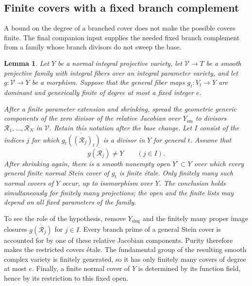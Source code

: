 \documentclass[12pt,a4paper,psamsfonts]{amsart}
\theoremstyle{definition}
\theoremstyle{plain}
\newtheorem{lemma}{Lemma}[section]
\begin{document}
\subsection{Finite covers with a fixed branch complement}

A bound on the degree of a branched cover does not make the
possible covers finite.  The final companion input supplies the
needed fixed branch complement from a family whose branch
divisors do not sweep the base.

\begin{lemma}
\label{j:finite-covers}
Let $Y$ be a normal integral projective variety, let
$\mathcal V\to T$ be a smooth projective family with integral
fibers over an integral parameter variety, and let
$g:\mathcal V\to Y$ be a morphism.  Suppose that the general
fiber maps $g_t:V_t\to Y$ are dominant and generically finite of
degree at most a fixed integer $e$.

After a finite parameter extension and shrinking, spread the
geometric generic components of the zero divisor of the relative
Jacobian over $Y_{\mathrm{sm}}$ to divisors
$\mathcal R_1,\ldots,\mathcal R_N$ in $\mathcal V$.
Retain this notation after the base change.  Let $I$ consist of
the indices $j$ for which
$\overline{g_t((\mathcal R_j)_t)}$ is a divisor in $Y$ for general
$t$.  Assume that
\[
 \overline{g(\mathcal R_j)}\ne Y\qquad(j\in I).
\]
After shrinking again, there is a smooth nonempty open
$Y^\circ\subset Y$ over which every general finite normal Stein
cover of $g_t$ is finite \'etale.  Only finitely many such normal
covers of $Y$ occur, up to isomorphism over $Y$.
The conclusion holds simultaneously for finitely many
projections; the open and the finite lists may depend on all
fixed parameters of the family.
\end{lemma}

To see the role of the hypothesis, remove $Y_{\mathrm{sing}}$
and the finitely many proper image closures
$\overline{g(\mathcal R_j)}$ for $j\in I$.  Every branch prime
of a general Stein cover is accounted for by one of these
relative Jacobian components.  Purity therefore makes the
restricted covers \'etale.  The fundamental group of the
resulting smooth complex variety is finitely generated, so it
has only finitely many covers of degree at most $e$.  Finally,
a finite normal cover of $Y$ is determined by its function
field, hence by its restriction to this fixed open.
\end{document}
